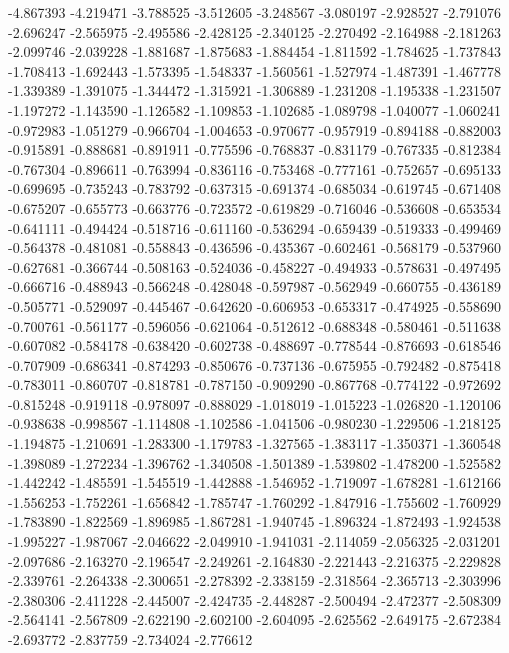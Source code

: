 -4.867393
-4.219471
-3.788525
-3.512605
-3.248567
-3.080197
-2.928527
-2.791076
-2.696247
-2.565975
-2.495586
-2.428125
-2.340125
-2.270492
-2.164988
-2.181263
-2.099746
-2.039228
-1.881687
-1.875683
-1.884454
-1.811592
-1.784625
-1.737843
-1.708413
-1.692443
-1.573395
-1.548337
-1.560561
-1.527974
-1.487391
-1.467778
-1.339389
-1.391075
-1.344472
-1.315921
-1.306889
-1.231208
-1.195338
-1.231507
-1.197272
-1.143590
-1.126582
-1.109853
-1.102685
-1.089798
-1.040077
-1.060241
-0.972983
-1.051279
-0.966704
-1.004653
-0.970677
-0.957919
-0.894188
-0.882003
-0.915891
-0.888681
-0.891911
-0.775596
-0.768837
-0.831179
-0.767335
-0.812384
-0.767304
-0.896611
-0.763994
-0.836116
-0.753468
-0.777161
-0.752657
-0.695133
-0.699695
-0.735243
-0.783792
-0.637315
-0.691374
-0.685034
-0.619745
-0.671408
-0.675207
-0.655773
-0.663776
-0.723572
-0.619829
-0.716046
-0.536608
-0.653534
-0.641111
-0.494424
-0.518716
-0.611160
-0.536294
-0.659439
-0.519333
-0.499469
-0.564378
-0.481081
-0.558843
-0.436596
-0.435367
-0.602461
-0.568179
-0.537960
-0.627681
-0.366744
-0.508163
-0.524036
-0.458227
-0.494933
-0.578631
-0.497495
-0.666716
-0.488943
-0.566248
-0.428048
-0.597987
-0.562949
-0.660755
-0.436189
-0.505771
-0.529097
-0.445467
-0.642620
-0.606953
-0.653317
-0.474925
-0.558690
-0.700761
-0.561177
-0.596056
-0.621064
-0.512612
-0.688348
-0.580461
-0.511638
-0.607082
-0.584178
-0.638420
-0.602738
-0.488697
-0.778544
-0.876693
-0.618546
-0.707909
-0.686341
-0.874293
-0.850676
-0.737136
-0.675955
-0.792482
-0.875418
-0.783011
-0.860707
-0.818781
-0.787150
-0.909290
-0.867768
-0.774122
-0.972692
-0.815248
-0.919118
-0.978097
-0.888029
-1.018019
-1.015223
-1.026820
-1.120106
-0.938638
-0.998567
-1.114808
-1.102586
-1.041506
-0.980230
-1.229506
-1.218125
-1.194875
-1.210691
-1.283300
-1.179783
-1.327565
-1.383117
-1.350371
-1.360548
-1.398089
-1.272234
-1.396762
-1.340508
-1.501389
-1.539802
-1.478200
-1.525582
-1.442242
-1.485591
-1.545519
-1.442888
-1.546952
-1.719097
-1.678281
-1.612166
-1.556253
-1.752261
-1.656842
-1.785747
-1.760292
-1.847916
-1.755602
-1.760929
-1.783890
-1.822569
-1.896985
-1.867281
-1.940745
-1.896324
-1.872493
-1.924538
-1.995227
-1.987067
-2.046622
-2.049910
-1.941031
-2.114059
-2.056325
-2.031201
-2.097686
-2.163270
-2.196547
-2.249261
-2.164830
-2.221443
-2.216375
-2.229828
-2.339761
-2.264338
-2.300651
-2.278392
-2.338159
-2.318564
-2.365713
-2.303996
-2.380306
-2.411228
-2.445007
-2.424735
-2.448287
-2.500494
-2.472377
-2.508309
-2.564141
-2.567809
-2.622190
-2.602100
-2.604095
-2.625562
-2.649175
-2.672384
-2.693772
-2.837759
-2.734024
-2.776612
